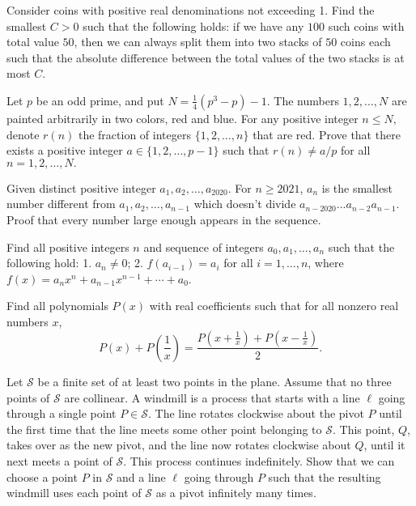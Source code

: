 \documentclass[11pt]{scrartcl}
\begin{document}
\begin{problem}[46260042068525]
Consider coins with positive real denominations not exceeding 1. Find the smallest $C>0$ such that the following holds: if we have any $100$ such coins with total value $50$, then we can always split them into two stacks of $50$ coins each such that the absolute difference between the total values of the two stacks is at most $C$.
\end{problem}
\begin{problem}[47893544380608]
	Let $p$ be an odd prime, and put $N=\frac{1}{4} (p^3 -p) -1.$ The numbers $1,2, \dots, N$ are painted arbitrarily in two colors, red and blue. For any positive integer $n \leqslant N,$ denote $r(n)$ the fraction of integers $\{ 1,2, \dots, n \}$ that are red.
Prove that there exists a positive integer $a \in \{ 1,2, \dots, p-1\}$ such that $r(n) \neq a/p$ for all $n = 1,2, \dots , N.$
\end{problem}
\begin{problem}[49176210180812]
Given distinct positive integer $ a_1,a_2,…,a_{2020} $. For $ n \ge 2021 $, $a_n$ is the smallest number different from $a_1,a_2,…,a_{n-1}$ which doesn't divide $a_{n-2020}...a_{n-2}a_{n-1}$. Proof that every number large enough appears in the sequence.
\end{problem}
\begin{problem}[52438029112433]
Find all positive integers $n$ and sequence of integers $a_0,a_1,\ldots, a_n$ such that the following hold:
1. $a_n\neq 0$;
2. $f(a_{i-1})=a_i$ for all $i=1,\ldots, n$, where $f(x) = a_nx^n+a_{n-1}x^{n-1}+\cdots +a_0$.
\end{problem}
\begin{problem}[53652353880893]
Find all polynomials \(P(x)\) with real coefficients such that for all nonzero real numbers \(x\),\[P(x)+P\left(\frac1x\right)     =\frac{P\left(x+\frac1x\right) +P\left(x-\frac1x\right)}2.\]
\end{problem}
\begin{problem}[56332281758558]
	Let $\mathcal{S}$ be a finite set of at least two points in the plane. Assume that no three points of $\mathcal S$ are collinear. A windmill is a process that starts with a line $\ell$ going through a single point $P \in \mathcal S$. The line rotates clockwise about the pivot $P$ until the first time that the line meets some other point belonging to $\mathcal S$. This point, $Q$, takes over as the new pivot, and the line now rotates clockwise about $Q$, until it next meets a point of $\mathcal S$. This process continues indefinitely.
Show that we can choose a point $P$ in $\mathcal S$ and a line $\ell$ going through $P$ such that the resulting windmill uses each point of $\mathcal S$ as a pivot infinitely many times.
\end{problem}
\end{document}
